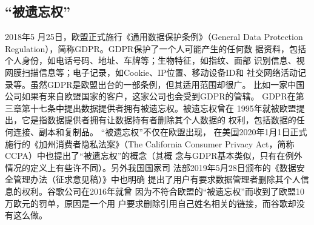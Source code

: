 \subsection{“被遗忘权”}
2018年5 月25日，欧盟正式施行《通用数据保护条例》（General Data
Protection Regulation）\cite{gdpr2018}，简称GDPR。GDPR保护了一个人可能产生的任何数
据资料，包括个人身份，如电话号码、地址、车牌等；生物特征，如指纹、面部
识别信息、视网膜扫描信息等；电子记录，如Cookie、IP位置、移动设备ID和
社交网络活动记录等。虽然GDPR是欧盟出台的一部条例，但其适用范围却很广\cite{visser2017,10.1007/978-3-030-21752-5_4,Kwak2017LetMU,Francesco2018}。
比如一家中国公司如果有来自欧盟国家的客户，这家公司也会受到GDPR的管辖。
GDPR在第三章第十七条中提出数据提供者拥有被遗忘权\cite{sarkar:hal-01824058,VILLARONGA2018304}。被遗忘权曾在
1995年就被欧盟提出，它是指数据提供者拥有让数据持有者删除其个人数据的
权利，包括数据的任何连接、副本和复制品。 “被遗忘权”不仅在欧盟出现，
在美国2020年1月1日正式施行的《加州消费者隐私法案》（The California
Consumer Privacy Act，简称CCPA）\cite{ccpa2020}中也提出了“被遗忘权”的概念（其概
念与GDPR基本类似，只有在例外情况的定义上有些许不同）。另外我国国家司
法部2019年5月28日颁布的《数据安全管理办法（征求意见稿）》\cite{gbt35273}中也明确
提出了用户有要求数据管理者删除其个人信息的权利。谷歌公司在2016年就曾
因为不符合欧盟的“被遗忘权”而收到了欧盟10万欧元的罚单，原因是一个用
户要求删除引用自己姓名相关的链接，而谷歌却没有这么做。




